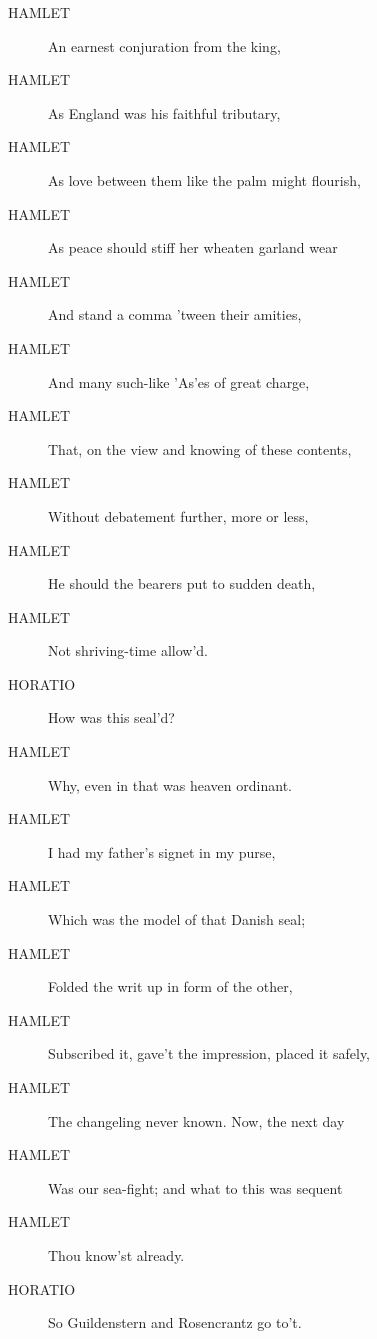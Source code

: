 \documentclass{article}
\begin{document}
\begin{description}
            
\item[HAMLET] An earnest conjuration from the king,
\item[HAMLET] As England was his faithful tributary,
\item[HAMLET] As love between them like the palm might flourish,
\item[HAMLET] As peace should stiff her wheaten garland wear
\item[HAMLET] And stand a comma 'tween their amities,
\item[HAMLET] And many such-like 'As'es of great charge,
\item[HAMLET] That, on the view and knowing of these contents,
\item[HAMLET] Without debatement further, more or less,
\item[HAMLET] He should the bearers put to sudden death,
\item[HAMLET] Not shriving-time allow'd.
\end{description}
          
\begin{description}
            
\item[HORATIO] How was this seal'd?
\end{description}
          
\begin{description}
            
\item[HAMLET] Why, even in that was heaven ordinant.
\item[HAMLET] I had my father's signet in my purse,
\item[HAMLET] Which was the model of that Danish seal;
\item[HAMLET] Folded the writ up in form of the other,
\item[HAMLET] Subscribed it, gave't the impression, placed it safely,
\item[HAMLET] The changeling never known. Now, the next day
\item[HAMLET] Was our sea-fight; and what to this was sequent
\item[HAMLET] Thou know'st already.
\end{description}
          
\begin{description}
            
\item[HORATIO] So Guildenstern and Rosencrantz go to't.
\end{description}
          
\end{document}
